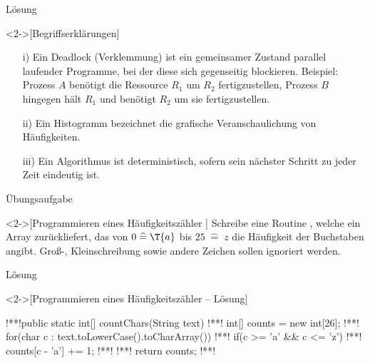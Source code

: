 \begin{frame}[c,fragile]{Lösung}
    \begin{solve}<2->[Begriffserklärungen]
        \begin{enumerate}[<+(1)->]
            \item[i)] Ein Deadlock (Verklemmung) ist ein gemeinsamer Zustand parallel laufender Programme,\pause{} bei der diese sich gegenseitig blockieren.\pause{} Beispiel:\pause{} Prozess \(A\) benötigt die Ressource \(R_1\) um \(R_2\) fertigzustellen,\pause{} Prozess \(B\) hingegen hält \(R_1\) und benötigt \(R_2\) um sie fertigzustellen.
            \item[ii)] Ein Histogramm bezeichnet die grafische Veranschaulichung von Häufigkeiten.
            \item[iii)] Ein Algorithmus ist deterministisch, sofern sein nächster Schritt zu jeder Zeit eindeutig ist.
        \end{enumerate}
    \end{solve}
\end{frame}

\begin{frame}[c,fragile]{Übungsaufgabe}
    \begin{exercise}<2->[Programmieren eines Häufigkeitszähler ]
        \pause{}Schreibe eine Routine , welche ein Array  zurückliefert,\pause{} das von \(0 \;\widehat{=}\; \T{a}\)\pause{} bis \(25 \;\widehat{=}\; z\) die Häufigkeit der Buchstaben angibt.\pause{} Groß-, Kleinschreibung sowie andere Zeichen sollen ignoriert werden.
    \end{exercise}
\end{frame}

\begin{frame}[c,fragile]{Lösung}
    \begin{solve}<2->[Programmieren eines Häufigkeitszähler -- Lösung]
        \begin{plainjava}
!**!public static int[] countChars(String text){
!**!    int[] counts = new int[26];
!**!    for(char c : text.toLowerCase().toCharArray()){
!**!        if(c >= 'a' && c <= 'z')
!**!            counts[c - 'a'] += 1;
!**!    }
!**!    return counts;
!**!}
        \end{plainjava}
    \end{solve}
\end{frame}


